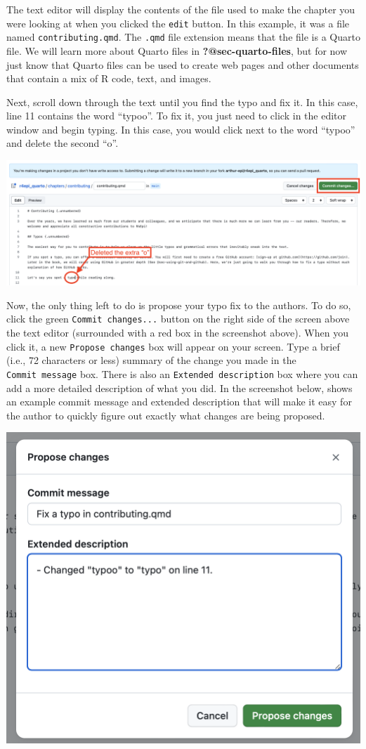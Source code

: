 \documentclass[
  letterpaper,
  DIV=11,
  numbers=noendperiod]{scrreprt}
\begin{document}
The text editor will display the contents of the file used to make the
chapter you were looking at when you clicked the \texttt{edit} button.
In this example, it was a file named \texttt{contributing.qmd}. The
\texttt{.qmd} file extension means that the file is a Quarto file. We
will learn more about Quarto files in \textbf{?@sec-quarto-files}, but
for now just know that Quarto files can be used to create web pages and
other documents that contain a mix of R code, text, and images.

Next, scroll down through the text until you find the typo and fix it.
In this case, line 11 contains the word ``typoo''. To fix it, you just
need to click in the editor window and begin typing. In this case, you
would click next to the word ``typoo'' and delete the second ``o''.

\includegraphics{chapters/contributing/fix_typo.png}

Now, the only thing left to do is propose your typo fix to the authors.
To do so, click the green \texttt{Commit\ changes...} button on the
right side of the screen above the text editor (surrounded with a red
box in the screenshot above). When you click it, a new
\texttt{Propose\ changes} box will appear on your screen. Type a brief
(i.e., 72 characters or less) summary of the change you made in the
\texttt{Commit\ message} box. There is also an
\texttt{Extended\ description} box where you can add a more detailed
description of what you did. In the screenshot below, shows an example
commit message and extended description that will make it easy for the
author to quickly figure out exactly what changes are being proposed.

\includegraphics{chapters/contributing/propose_changes.png}
\end{document}
